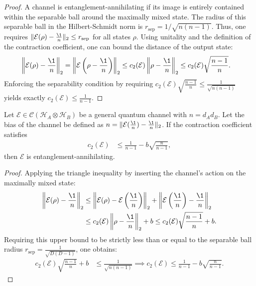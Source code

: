 \begin{proof}
A channel is entanglement-annihilating if its image is entirely contained within the separable ball around the maximally mixed state. The radius of this separable ball in the Hilbert-Schmidt norm is $r_{\text{sep}} = {1}/{\sqrt{n(n-1)}}$. Thus, one requires $\|\mathcal{E}(\rho) - \frac{\1}{n}\|_2 \le r_{\text{sep}}$ for all states $\rho$. Using unitality and the definition of the contraction coefficient, one can bound the distance of the output state:
\begin{align*}
    \left\| \mathcal{E}(\rho) - \frac{\1}{n} \right\|_2 &= \left\| \mathcal{E}\left(\rho - \frac{\1}{n}\right) \right\|_2 \le c_2(\mathcal{E}) \left\| \rho - \frac{\1}{n} \right\|_2 \le c_2(\mathcal{E}) \sqrt{\frac{n-1}{n}}.
\end{align*}
Enforcing the separability condition by requiring $c_2(\mathcal{E}) \sqrt{\frac{n-1}{n}} \le \frac{1}{\sqrt{n(n-1)}}$ yields exactly $c_2(\mathcal{E}) \le \frac{1}{n-1}$.
\end{proof}

\begin{prop}\label{prop:ea-contraction}
Let $\mathcal{E} \in \mathcal{C}(\mathcal{H}_A \otimes \mathcal{H}_B)$ be a general quantum channel with $n = d_A d_B$. Let the bias of the channel be defined as $n = \| \mathcal{E}(\frac{\1}{n}) - \frac{\1}{n} \|_2$. If the contraction coefficient satisfies
\begin{align*}
    c_2(\mathcal{E}) &\le \frac{1}{n - 1} - b \sqrt{\frac{n}{n - 1}},
\end{align*}
then $\mathcal{E}$ is entanglement-annihilating.
\end{prop}

\begin{proof}
Applying the triangle inequality by inserting the channel's action on the maximally mixed state:
\begin{align*}
    \left\| \mathcal{E}(\rho) - \frac{\1}{n} \right\|_2 &\le \left\| \mathcal{E}(\rho) - \mathcal{E}\left(\frac{\1}{n}\right) \right\|_2 + \left\| \mathcal{E}\left(\frac{\1}{n}\right) - \frac{\1}{n} \right\|_2 \\
    &\le c_2(\mathcal{E}) \left\| \rho - \frac{\1}{n} \right\|_2 + b \le c_2(\mathcal{E}) \sqrt{\frac{n-1}{n}} + b.
\end{align*}
Requiring this upper bound to be strictly less than or equal to the separable ball radius $r_{\text{sep}} = \frac{1}{\sqrt{D(D-1)}}$, one obtains:
\begin{align*}
    c_2(\mathcal{E}) \sqrt{\frac{n-1}{n}} + b &\le \frac{1}{\sqrt{n(n-1)}} \implies c_2(\mathcal{E}) \le \frac{1}{n-1} - b\sqrt{\frac{n}{n-1}}.
\end{align*}
\end{proof}

